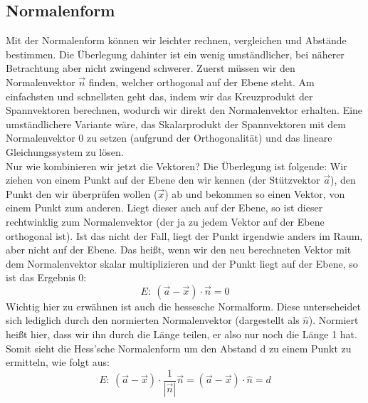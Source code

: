\subsection{Normalenform}
Mit der Normalenform können wir leichter rechnen, vergleichen und Abstände bestimmen. Die Überlegung dahinter ist ein wenig umständlicher, bei näherer Betrachtung aber nicht zwingend schwerer. Zuerst müssen wir den Normalenvektor \(\vec{n}\) finden, welcher orthogonal auf der Ebene steht. Am einfachsten und schnellsten geht das, indem wir das Kreuzprodukt der Spannvektoren berechnen, wodurch wir direkt den Normalenvektor erhalten. Eine umständlichere Variante wäre, das Skalarprodukt der Spannvektoren mit dem Normalenvektor 0 zu setzen (aufgrund der Orthogonalität) und das lineare Gleichungssystem zu lösen.\\
Nur wie kombinieren wir jetzt die Vektoren? Die Überlegung ist folgende: Wir ziehen von einem Punkt auf der Ebene den wir kennen (der Stützvektor \(\vec{a}\)), den Punkt den wir überprüfen wollen (\(\vec{x}\)) ab und bekommen so einen Vektor, von einem Punkt zum anderen. Liegt dieser auch auf der Ebene, so ist dieser rechtwinklig zum Normalenvektor (der ja zu jedem Vektor auf der Ebene orthogonal ist). Ist das nicht der Fall, liegt der Punkt irgendwie anders im Raum, aber nicht auf der Ebene. Das heißt, wenn wir den neu berechneten Vektor mit dem Normalenvektor skalar multiplizieren und der Punkt liegt auf der Ebene, so ist das Ergebnis 0:
\[E:\ (\vec{a}-\vec{x})\cdot\vec{n}=0\]
Wichtig hier zu erwähnen ist auch die hessesche Normalform. Diese unterscheidet sich lediglich durch den normierten Normalenvektor (dargestellt als \(\hat n\)). Normiert heißt hier, dass wir ihn durch die Länge teilen, er also nur noch die Länge 1 hat. Somit sieht die Hess'sche Normalenform um den Abstand d zu einem Punkt zu ermitteln, wie folgt aus:
\[E:\ (\vec{a}-\vec{x})\cdot \frac{1}{|\vec{n}|}\vec{n}=(\vec{a}-\vec{x})\cdot \hat{n}=d\]

